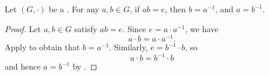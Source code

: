 \begin{corollary} \label{corollary:elements_of_group_that_multiply_to_identity_are_inverses}
    Let $(G,\cdot)$ be a . For any $a,b \in G$, if $ab = e$, then $b = a^{-1}$, and $a = b^{-1}$.
\end{corollary}
\begin{proof}
    Let $a,b \in G$ satisfy $ab = e$. Since $e = a \cdot a^{-1}$, we have
    $$a \cdot b = a \cdot a^{-1}.$$
    Apply  to obtain that $b = a^{-1}$. Similarly, $e = b^{-1} \cdot b$, so
    $$a \cdot b  = b^{-1} \cdot b$$
    and hence $a = b^{-1}$ by .
\end{proof}
